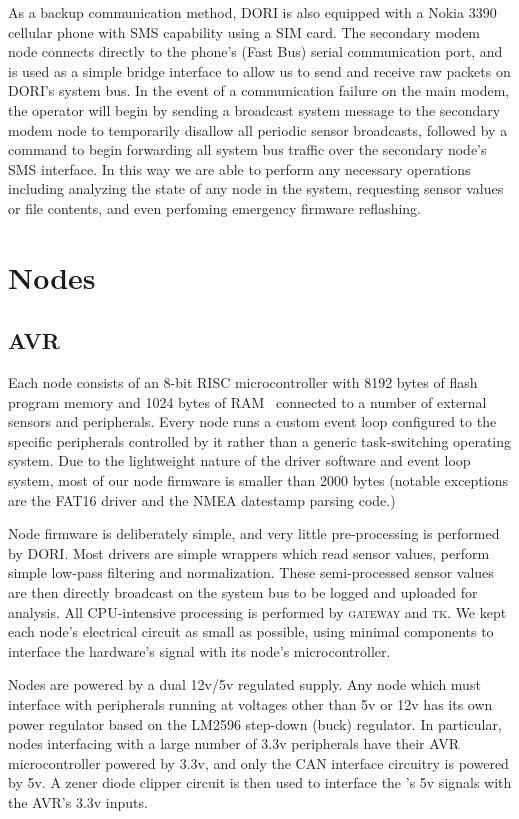     As a backup communication method, DORI is also equipped with a Nokia 3390 cellular phone with SMS capability using a  SIM card. The secondary modem node connects directly to the phone's  (Fast Bus) serial communication port, and is used as a simple bridge interface to allow us to send and receive raw packets on DORI's system bus. In the event of a communication failure on the main modem, the operator will begin by sending a broadcast system message to the secondary modem node to temporarily disallow all periodic sensor broadcasts, followed by a command to begin forwarding all system bus traffic over the secondary node's SMS interface. In this way we are able to perform any necessary operations including analyzing the state of any node in the system, requesting sensor values or file contents, and even perfoming emergency firmware reflashing.

    \section{Nodes}
        \subsection{AVR}
        Each node consists of an  8-bit RISC microcontroller with 8192 bytes of flash program memory and 1024 bytes of RAM~\cite{atmega88} connected to a number of external sensors and peripherals. Every node runs a custom event loop configured to the specific peripherals controlled by it rather than a generic task-switching operating system. Due to the lightweight nature of the driver software and event loop system, most of our node firmware is smaller than 2000 bytes (notable exceptions are the FAT16 driver and the NMEA datestamp parsing code.)

        Node firmware is deliberately simple, and very little pre-processing is performed by DORI. Most drivers are simple wrappers which read sensor values, perform simple low-pass filtering and normalization. These semi-processed sensor values are then directly broadcast on the system bus to be logged and uploaded for analysis. All CPU-intensive processing is performed by \textsc{gateway} and \textsc{tk}. We kept each node's electrical circuit as small as possible, using minimal components to interface the hardware's signal with its node's microcontroller.
        
        Nodes are powered by a dual 12v/5v regulated supply. Any node which must interface with peripherals running at voltages other than 5v or 12v has its own power regulator based on the LM2596 step-down (buck) regulator. In particular, nodes interfacing with a large number of 3.3v peripherals have their AVR microcontroller powered by 3.3v, and only the  CAN interface circuitry is powered by 5v. A zener diode clipper circuit is then used to interface the 's 5v signals with the AVR's 3.3v inputs.

